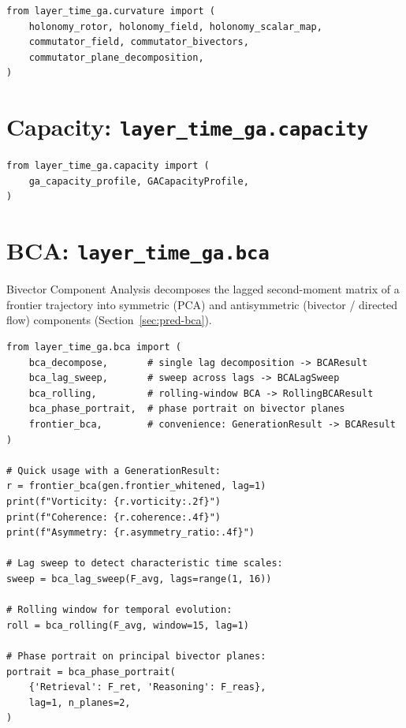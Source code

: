 \documentclass[11pt, twoside, openright]{memoir}
\numberwithin{equation}{chapter}
\begin{document}
\begin{lstlisting}
from layer_time_ga.curvature import (
    holonomy_rotor, holonomy_field, holonomy_scalar_map,
    commutator_field, commutator_bivectors,
    commutator_plane_decomposition,
)
\end{lstlisting}

\section{Capacity: \texttt{layer\_time\_ga.capacity}}

\begin{lstlisting}
from layer_time_ga.capacity import (
    ga_capacity_profile, GACapacityProfile,
)
\end{lstlisting}

\section{BCA: \texttt{layer\_time\_ga.bca}}

Bivector Component Analysis decomposes the lagged second-moment matrix
of a frontier trajectory into symmetric (PCA) and antisymmetric
(bivector / directed flow) components
(Section~\ref{sec:pred-bca}).

\begin{lstlisting}[caption={BCA module API}]
from layer_time_ga.bca import (
    bca_decompose,       # single lag decomposition -> BCAResult
    bca_lag_sweep,       # sweep across lags -> BCALagSweep
    bca_rolling,         # rolling-window BCA -> RollingBCAResult
    bca_phase_portrait,  # phase portrait on bivector planes
    frontier_bca,        # convenience: GenerationResult -> BCAResult
)

# Quick usage with a GenerationResult:
r = frontier_bca(gen.frontier_whitened, lag=1)
print(f"Vorticity: {r.vorticity:.2f}")
print(f"Coherence: {r.coherence:.4f}")
print(f"Asymmetry: {r.asymmetry_ratio:.4f}")

# Lag sweep to detect characteristic time scales:
sweep = bca_lag_sweep(F_avg, lags=range(1, 16))

# Rolling window for temporal evolution:
roll = bca_rolling(F_avg, window=15, lag=1)

# Phase portrait on principal bivector planes:
portrait = bca_phase_portrait(
    {'Retrieval': F_ret, 'Reasoning': F_reas},
    lag=1, n_planes=2,
)
\end{lstlisting}


\end{document}
